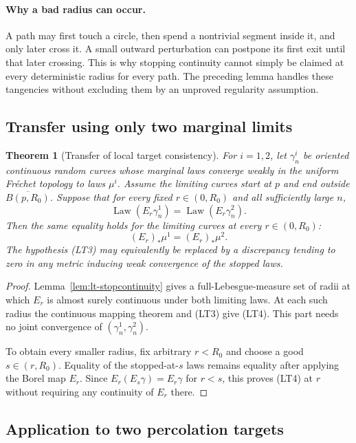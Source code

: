 \documentclass[11pt]{article}
\newtheorem{theorem}{Theorem}[section]
\theoremstyle{definition}\newtheorem{definition}[theorem]{Definition}
\theoremstyle{remark}\newtheorem{remark}[theorem]{Remark}
\begin{document}
\paragraph{Why a bad radius can occur.}
A path may first touch a circle, then spend a nontrivial segment inside it,
and only later cross it. A small outward perturbation can postpone its
first exit until that later crossing. This is why stopping continuity
cannot simply be claimed at every deterministic radius for every path.
The preceding lemma handles these tangencies without excluding them by an
unproved regularity assumption.

\subsection{Transfer using only two marginal limits}

\begin{theorem}[Transfer of local target consistency]
\label{thm:lt-transfer}
For $i=1,2$, let $\gamma_n^i$ be oriented continuous random curves whose
marginal laws converge weakly in the uniform Fr\'echet topology to laws
$\mu^i$. Assume the limiting curves start at $p$ and end outside
$\overline{B(p,R_0)}$. Suppose that for every fixed $r\in(0,R_0)$ and all
sufficiently large $n$,
\[
 \operatorname{Law}(E_r\gamma_n^1)
 =\operatorname{Law}(E_r\gamma_n^2).
 \tag{LT3}
\]
Then the same equality holds for the limiting curves at \emph{every}
$r\in(0,R_0)$:
\[
 (E_r)_*\mu^1=(E_r)_*\mu^2.
 \tag{LT4}
\]
The hypothesis (LT3) may equivalently be replaced by a discrepancy tending
to zero in any metric inducing weak convergence of the stopped laws.
\end{theorem}
\begin{proof}
Lemma~\ref{lem:lt-stopcontinuity} gives a full-Lebesgue-measure set of
radii at which $E_r$ is almost surely continuous under both limiting laws.
At each such radius the continuous mapping theorem and (LT3) give (LT4).
This part needs no joint convergence of $(\gamma_n^1,\gamma_n^2)$.

To obtain every smaller radius, fix arbitrary $r<R_0$ and choose a good
$s\in(r,R_0)$. Equality of the stopped-at-$s$ laws remains equality after
applying the Borel map $E_r$. Since
$E_r(E_s\gamma)=E_r\gamma$ for $r<s$, this proves (LT4) at $r$ without
requiring any continuity of $E_r$ there.
\end{proof}

\subsection{Application to two percolation targets}
\end{document}
